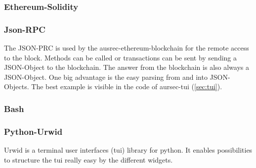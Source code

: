 
\subsubsection*{Ethereum-Solidity}
\subsubsection*{Json-RPC}
The JSON-PRC is used by the ausrec-ethereum-blockchain for the remote access to the block. Methods can be called or transactions can be sent by sending a JSON-Object to the blockchain. The answer from the blockchain is also always a JSON-Object. One big advantage is the easy parsing from and into JSON-Objects. The best example is visible in the code of aursec-tui (\ref{sec:tui}).
\subsubsection*{Bash}
\subsubsection*{Python-Urwid}
Urwid is a terminal user interfaces (tui) library for python. It enables possibilities to structure the tui really easy by the different widgets. 

